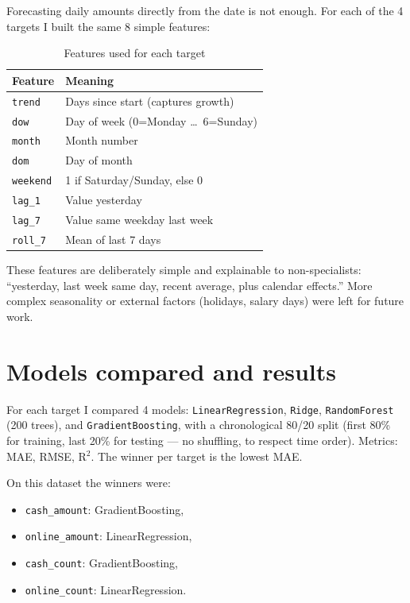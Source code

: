 \documentclass[12pt,a4paper]{report}
\begin{document}
Forecasting daily amounts directly from the date is not enough. For each of the 4 targets I built the same 8 simple features:

\begin{table}[H]
\centering
\caption{Features used for each target}
\begin{tabular}{@{}ll@{}}
\toprule
Feature & Meaning \\
\midrule
\texttt{trend} & Days since start (captures growth) \\
\texttt{dow} & Day of week (0=Monday \dots\ 6=Sunday) \\
\texttt{month} & Month number \\
\texttt{dom} & Day of month \\
\texttt{weekend} & 1 if Saturday/Sunday, else 0 \\
\texttt{lag\_1} & Value yesterday \\
\texttt{lag\_7} & Value same weekday last week \\
\texttt{roll\_7} & Mean of last 7 days \\
\bottomrule
\end{tabular}
\end{table}

These features are deliberately simple and explainable to non-specialists: ``yesterday, last week same day, recent average, plus calendar effects.'' More complex seasonality or external factors (holidays, salary days) were left for future work.

\section{Models compared and results}

For each target I compared 4 models: \texttt{LinearRegression}, \texttt{Ridge}, \texttt{RandomForest} (200 trees), and \texttt{GradientBoosting}, with a chronological 80/20 split (first 80\% for training, last 20\% for testing --- no shuffling, to respect time order). Metrics: MAE, RMSE, R$^2$. The winner per target is the lowest MAE.

On this dataset the winners were:
\begin{itemize}
\item \texttt{cash\_amount}: GradientBoosting,
\item \texttt{online\_amount}: LinearRegression,
\item \texttt{cash\_count}: GradientBoosting,
\item \texttt{online\_count}: LinearRegression.
\end{itemize}
\end{document}
